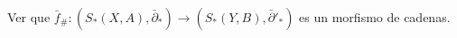 \begin{ejercicio}
Ver que $\bar{f}_\# \colon (S_*(X, A), \bar{\partial}_*) \to (S_*(Y, B), \bar{\partial}'_*)$ es un morfismo de cadenas.
\end{ejercicio}

\begin{demostracion}

\end{demostracion}

